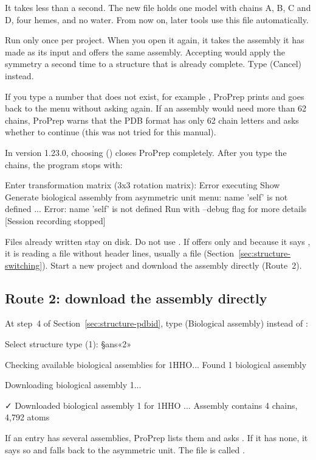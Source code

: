 It takes less than a second. The new file 
holds one model with chains A, B, C and D, four hemes, and no water. From now
on, later tools use this file automatically.

\begin{watchout}
Run  only once per project. When you open it again, it takes the
assembly it has made as its input and offers the same
 assembly. Accepting would apply the symmetry a second time
to a structure that is already complete. Type  (Cancel) instead.
\end{watchout}

If you type a number that does not exist, for example , ProPrep prints
 and goes back to the menu without asking
again. If an assembly would need more than 62 chains, ProPrep warns that the PDB
format has only 62 chain letters and asks whether to continue (this was not
tried for this manual).

\begin{watchout}
In version 1.23.0, choosing  () closes ProPrep completely. After you type the chains, the program
stops with:
\begin{screen}
Enter transformation matrix (3x3 rotation matrix):
Error executing Show Generate biological assembly from asymmetric unit menu:
name 'self' is not defined
...
Error: name 'self' is not defined
Run with --debug flag for more details
[Session recording stopped]
\end{screen}
Files already written stay on disk. Do not use . If  offers only
 and  because it says , it is reading a file without header lines, usually a  file
(Section~\ref{sec:structure-switching}). Start a new project and download the
assembly directly (Route~2).
\end{watchout}

\subsection{Route 2: download the assembly directly}

At step~4 of Section~\ref{sec:structure-pdbid}, type 
(Biological assembly) instead of :
\begin{screen}
Select structure type (1): §ans«2»

Checking available biological assemblies for 1HHO...
Found 1 biological assembly

Downloading biological assembly 1...

✓ Downloaded biological assembly 1 for 1HHO
...
Assembly contains 4 chains, 4,792 atoms
\end{screen}
If an entry has several assemblies, ProPrep lists them and asks
. If it has none, it says so and falls back
to the asymmetric unit. The file is called .

